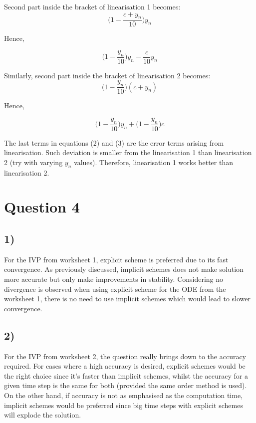 \documentclass[preprint,authoryear,10pt]{elsarticle}
\begin{document}
Second part inside the bracket of linearisation 1 becomes:
\begin{equation}
\Big(1-\frac{c+y_{n}}{10}\Big)y_{n}
\end{equation}

Hence,

\begin{equation}
\Big(1-\frac{y_{n}}{10}\Big)y_{n} - \frac{c}{10}y_{n}
\end{equation}

Similarly, second part inside the bracket of linearisation 2 becomes:
\begin{equation}
\Big(1-\frac{y_{n}}{10}\Big)(c+y_{n})
\end{equation}

Hence,

\begin{equation}
\Big(1-\frac{y_{n}}{10}\Big)y_{n} + \Big(1-\frac{y_{n}}{10}\Big)c
\end{equation}

The last terms in equations (2) and (3) are the error terms arising from linearisation. Such deviation is smaller from the linearisation 1 than linearisation 2 (try with varying $y_{n}$ values). Therefore, linearisation 1 works better than linearisation 2. 

\section{Question 4}

\subsection{1)}
For the IVP from worksheet 1, explicit scheme is preferred due to its fast convergence. As previously discussed, implicit schemes does not make solution more accurate but only make improvements in stability. Considering no divergence is observed when using explicit scheme for the ODE from the worksheet 1, there is no need to use implicit schemes which would lead to slower convergence. 

\subsection{2)}
For the IVP from worksheet 2, the question really brings down to the accuracy required. For cases where a high accuracy is desired, explicit schemes would be the right choice since it's faster than implicit schemes, whilst the accuracy for a given time step is the same for both (provided the same order method is used). On the other hand, if accuracy is not as emphasised as the computation time, implicit schemes would be preferred since big time steps with explicit schemes will explode the solution. 
\end{document}
